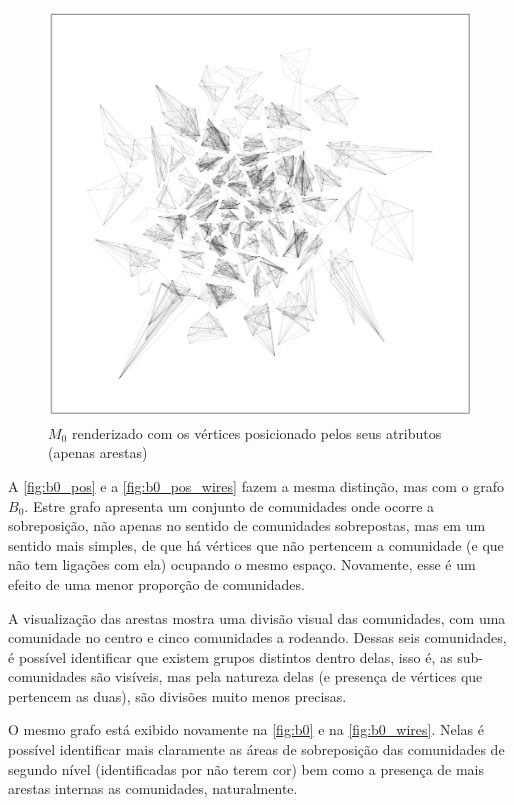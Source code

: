 \documentclass[notes.tex]{subfiles}
\begin{document}
\begin{figure}[htpb]
    \centering
    \caption{$M_0$ renderizado com os vértices posicionado pelos seus atributos (apenas arestas)}\label{fig:m0_pos_wires}
    \includegraphics[width=\textwidth, height=0.52\textheight]{figures/m0_pos_wires.png}
     \end{figure}

A \autoref{fig:b0_pos} e a \autoref{fig:b0_pos_wires} fazem a mesma distinção, mas com o grafo $B_0$.
Estre grafo apresenta um conjunto de comunidades onde ocorre a sobreposição, não apenas no sentido de comunidades sobrepostas, mas em um sentido mais simples, de que há vértices que não pertencem a comunidade (e que não tem ligações com ela) ocupando o mesmo espaço.
Novamente, esse é um efeito de uma menor proporção de comunidades.

A visualização das arestas mostra uma divisão visual das comunidades, com uma comunidade no centro e cinco comunidades a rodeando.
Dessas seis comunidades, é possível identificar que existem grupos distintos dentro delas, isso é, as sub-comunidades são visíveis, mas pela natureza delas (e presença de vértices que pertencem as duas), são divisões muito menos precisas.

O mesmo grafo está exibido novamente na \autoref{fig:b0} e na \autoref{fig:b0_wires}.
Nelas é possível identificar mais claramente as áreas de sobreposição das comunidades de segundo nível (identificadas por não terem cor) bem como a presença de mais arestas internas as comunidades, naturalmente.
\end{document}
